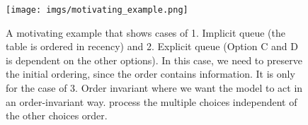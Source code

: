 \begin{figure}[!h]
{
\centering
    \texttt{[image: imgs/motivating\_example.png]}
    \caption{A motivating example that shows cases of 1. Implicit queue (the table is ordered in recency) and 2. Explicit queue (Option C and D is dependent on the other options). In this case, we need to preserve the initial ordering, since the order contains information. It is only for the case of 3. Order invariant where we want the model to act in an order-invariant way. process the multiple choices independent of the other choices order.}
    \label{fig:motivating_example}
}
\end{figure}
